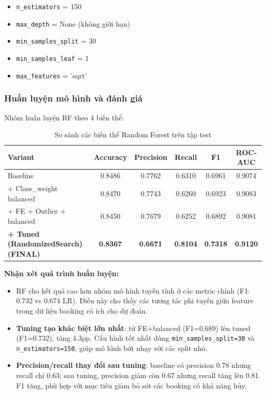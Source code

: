\documentclass[12pt, a4paper]{article}
\begin{document}
\begin{itemize}
    \item \texttt{n\_estimators} = 150
    \item \texttt{max\_depth} = None (không giới hạn)
    \item \texttt{min\_samples\_split} = 30
    \item \texttt{min\_samples\_leaf} = 1
    \item \texttt{max\_features} = 'sqrt'
\end{itemize}

\subsubsection{Huấn luyện mô hình và đánh giá}

Nhóm huấn luyện RF theo 4 biến thể:

\begin{table}[h!]
\centering
\caption{So sánh các biến thể Random Forest trên tập test}
\renewcommand{\arraystretch}{1.3}
\begin{tabular}{|l|c|c|c|c|c|}
\hline
\textbf{Variant} & \textbf{Accuracy} & \textbf{Precision} & \textbf{Recall} & \textbf{F1} & \textbf{ROC-AUC} \\ \hline
Baseline                         & 0.8486 & 0.7762 & 0.6310 & 0.6961 & 0.9074 \\ \hline
+ Class\_weight balanced         & 0.8470 & 0.7743 & 0.6260 & 0.6923 & 0.9083 \\ \hline
+ FE + Outlier + balanced        & 0.8450 & 0.7679 & 0.6252 & 0.6892 & 0.9081 \\ \hline
\textbf{+ Tuned (RandomizedSearch) (FINAL)} & \textbf{0.8367} & \textbf{0.6671} & \textbf{0.8104} & \textbf{0.7318} & \textbf{0.9120} \\ \hline
\end{tabular}
\end{table}

\textbf{Nhận xét quá trình huấn luyện:}

\begin{itemize}
    \item RF cho kết quả cao hơn nhóm mô hình tuyến tính ở các metric chính (F1: 0.732 vs 0.674 LR). Điều này cho thấy các tương tác phi tuyến giữa feature trong dữ liệu booking có ích cho dự đoán.

    \item \textbf{Tuning tạo khác biệt lớn nhất}: từ FE+balanced (F1=0.689) lên tuned (F1=0.732), tăng 4.3pp. Cấu hình tốt nhất dùng \texttt{min\_samples\_split=30} và \texttt{n\_estimators=150}, giúp mô hình bớt nhạy với các split nhỏ.

    \item \textbf{Precision/recall thay đổi sau tuning}: baseline có precision 0.78 nhưng recall chỉ 0.63; sau tuning, precision giảm còn 0.67 nhưng recall tăng lên 0.81. F1 tăng, phù hợp với mục tiêu giảm bỏ sót các booking có khả năng hủy.
\end{itemize}
\end{document}
